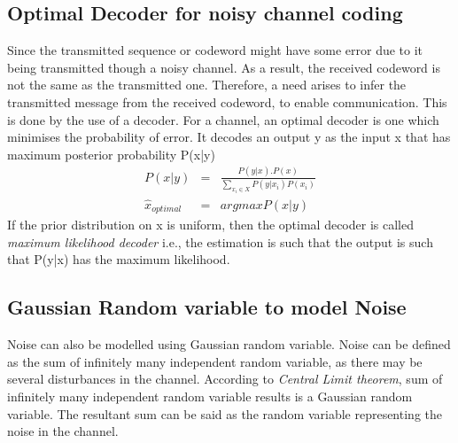 \documentclass[10pt,twocolumn,letterpaper]{article}
\begin{document}
\subsection{Optimal Decoder for noisy channel coding}
Since the transmitted sequence or codeword might have some error due to it being transmitted  though a noisy channel. As a result, the received codeword is not the same as the transmitted one. Therefore, a need arises to infer the transmitted message from the received codeword, to enable communication. This is done by the use of a decoder.
For a channel, an optimal decoder is one which minimises the probability of error. It decodes an output y as the input x that has maximum posterior probability P(x|y)
\begin{eqnarray*}
    P(x|y)&=&\frac{P(y|x).P(x)}{\sum_{x_i\in X}P(y|x_i)P(x_i)}\\
    \hat{x}_{optimal}&=&argmax P(x|y)
\end{eqnarray*}
If the prior distribution on x is uniform, then the optimal decoder is called \textit{maximum likelihood decoder} i.e., the estimation is such that the output is such that P(y|x) has the maximum likelihood.

\subsection{Gaussian Random variable to model Noise}
Noise can also be modelled using Gaussian random variable. Noise can be defined as the sum of infinitely many independent random variable, as there may be several disturbances in the channel. According to \textit{Central Limit theorem}, sum of infinitely many independent random variable results is a Gaussian random variable. The resultant sum can be said as the random variable representing the noise in the channel.

\end{document}

